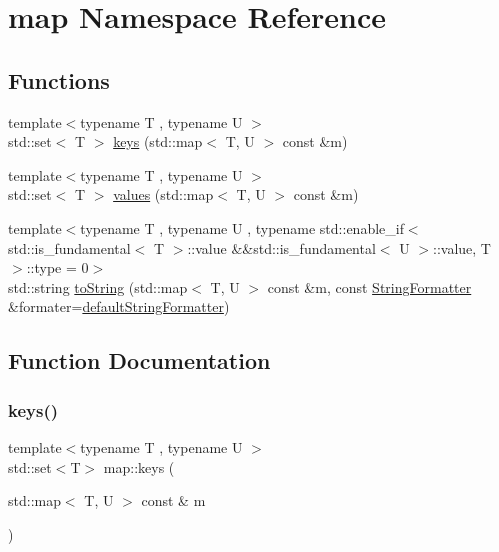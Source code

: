 \hypertarget{namespacemap}{}\section{map Namespace Reference}
\label{namespacemap}
\subsection*{Functions}
\begin{DoxyCompactItemize}
\item 
{\footnotesize template$<$typename T , typename U $>$ }\\std\+::set$<$ T $>$ \hyperlink{namespacemap_a0933403cc1970f74256fc07fb5ec898f}{keys} (std\+::map$<$ T, U $>$ const \&m)
\item 
{\footnotesize template$<$typename T , typename U $>$ }\\std\+::set$<$ T $>$ \hyperlink{namespacemap_a0c7435ff01b38c40e03b70ce95d40bd5}{values} (std\+::map$<$ T, U $>$ const \&m)
\item 
{\footnotesize template$<$typename T , typename U , typename std\+::enable\+\_\+if$<$ std\+::is\+\_\+fundamental$<$ T $>$\+::value \&\&std\+::is\+\_\+fundamental$<$ U $>$\+::value, T $>$\+::type  = 0$>$ }\\std\+::string \hyperlink{namespacemap_a7df0c3b516d256b69506233979c2d9e5}{to\+String} (std\+::map$<$ T, U $>$ const \&m, const \hyperlink{classStringFormatter}{String\+Formatter} \&formater=\hyperlink{stringFormatter_8h_abf1349c8e24162d0134072aff288f2a2}{default\+String\+Formatter})
\end{DoxyCompactItemize}


\subsection{Function Documentation}
\mbox{\label{namespacemap_a0933403cc1970f74256fc07fb5ec898f}} 
\subsubsection{\texorpdfstring{keys()}{keys()}}
{\footnotesize\ttfamily template$<$typename T , typename U $>$ \\
std\+::set$<$T$>$ map\+::keys (\begin{DoxyParamCaption}\item[{std\+::map$<$ T, U $>$ const \&}]{m }\end{DoxyParamCaption})}


